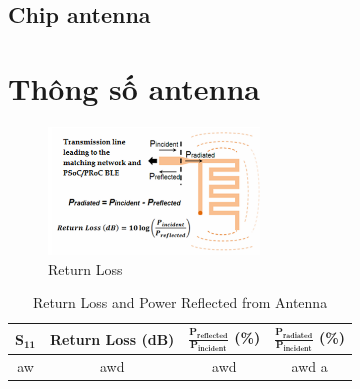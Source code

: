         \subsection{Chip antenna}

    \section{Thông số antenna}
        \begin{figure}[h]
            \centering
            \includegraphics[width=0.5\textwidth]{figures/return_loss_antenna.png}
            \caption{Return Loss}
            \label{fig:return_loss_antenna}
        \end{figure}
        
        \begin{table}[h]
            \centering
            \begin{tabular}{|c|c|c|c|}
                \hline
                $\mathbf{S_{11}}$   &   \textbf{Return Loss (dB)}   &   \textbf{$\mathbf{\frac{P_{reflected}}{P_{incident}}}$ (\%)} &   \textbf{$\mathbf{\frac{P_{radiated}}{P_{incident}}}$ (\%)}  \\\hline
                aw & awd & awd & awd a\\\hline
                
                
            \end{tabular}
            \caption{Return Loss and Power Reflected from Antenna}
            \label{tab:return_loss_antenna}
        \end{table}